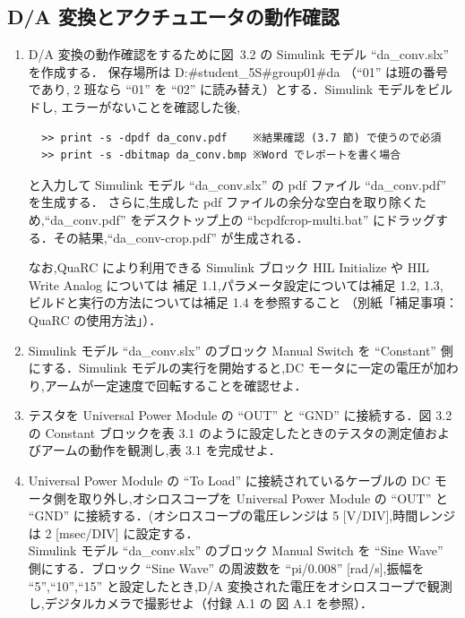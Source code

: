 \subsection{D/A 変換とアクチュエータの動作確認}
\begin{enumerate}
  \item D/A 変換の動作確認をするために図~3.2 の Simulink モデル ``da\_conv.slx'' を作成する．
        保存場所は D:\#student\_5S\#group01\#da （``01'' は班の番号であり,
        2 班なら ``01'' を ``02'' に読み替え）とする．Simulink モデルをビルドし,
        エラーがないことを確認した後,
        \begin{lstlisting}
  >> print -s -dpdf da_conv.pdf    ※結果確認 (3.7 節) で使うので必須
  >> print -s -dbitmap da_conv.bmp ※Word でレポートを書く場合
  \end{lstlisting}
        と入力して Simulink モデル ``da\_conv.slx'' の pdf ファイル ``da\_conv.pdf'' を生成する．
        さらに,生成した pdf ファイルの余分な空白を取り除くため,``da\_conv.pdf'' をデスクトップ上の
        ``bcpdfcrop-multi.bat'' にドラッグする．その結果,``da\_conv-crop.pdf'' が生成される．
        
        なお,QuaRC により利用できる Simulink ブロック HIL Initialize や HIL Write Analog については
        補足 1.1,パラメータ設定については補足 1.2, 1.3, ビルドと実行の方法については補足 1.4 を参照すること
        （別紙「補足事項：QuaRC の使用方法」）．
  \item Simulink モデル “da\_conv.slx” のブロック Manual Switch を “Constant” 側にする．Simulink モデルの実行を開始すると,DC モータに一定の電圧が加わり,アームが一定速度で回転することを確認せよ．
  \item テスタを Universal Power Module の “OUT” と “GND” に接続する．図 3.2 の Constant ブロックを表 3.1 のように設定したときのテスタの測定値およびアームの動作を観測し,表 3.1 を完成せよ．
  \item Universal Power Module の “To Load” に接続されているケーブルの DC モータ側を取り外し,オシロスコープを Universal Power Module の “OUT” と “GND” に接続する．(オシロスコープの電圧レンジは 5 [V/DIV],時間レンジは 2 [msec/DIV] に設定する．\\
        \quad Simulink モデル “da\_conv.slx” のブロック Manual Switch を “Sine Wave” 側にする．ブロック “Sine Wave” の周波数を “pi/0.008” [rad/s],振幅を “5”,“10”,“15” と設定したとき,D/A 変換された電圧をオシロスコープで観測し,デジタルカメラで撮影せよ（付録 A.1 の 図 A.1 を参照）．
\end{enumerate}

